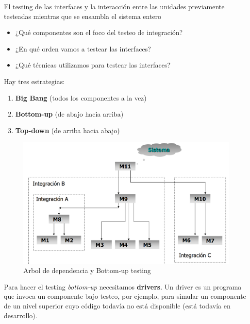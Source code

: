\begin{definition}
	El testing de las interfaces y la
	interacción entre las unidades previamente testeadas
	mientras que se ensambla el sistema entero
\end{definition}

\begin{itemize}
	\item ¿Qué componentes son el foco del testeo de integración?
	\item ¿En qué orden vamos a testear las interfaces?
	\item ¿Qué técnicas utilizamos para testear las interfaces?
\end{itemize}

Hay tres estrategias:
\begin{enumerate}
	\item \textbf{Big Bang} (todos los componentes a la vez)
	\item \textbf{Bottom-up} (de abajo hacia arriba)
	\item \textbf{Top-down} (de arriba hacia abajo)
\end{enumerate}

\begin{figure}[htbp]
	\centering
	\includegraphics{images/03/bottomup.png}
	\caption{Arbol de dependencia y Bottom-up testing}
	\label{fig:03/bottomup}
\end{figure}

Para hacer el testing \textit{bottom-up} necesitamos \textbf{drivers}.
Un driver es un programa que invoca un componente bajo testeo, por ejemplo, para simular un componente de un nivel superior cuyo código todavía no está disponible (está todavía en desarrollo).

